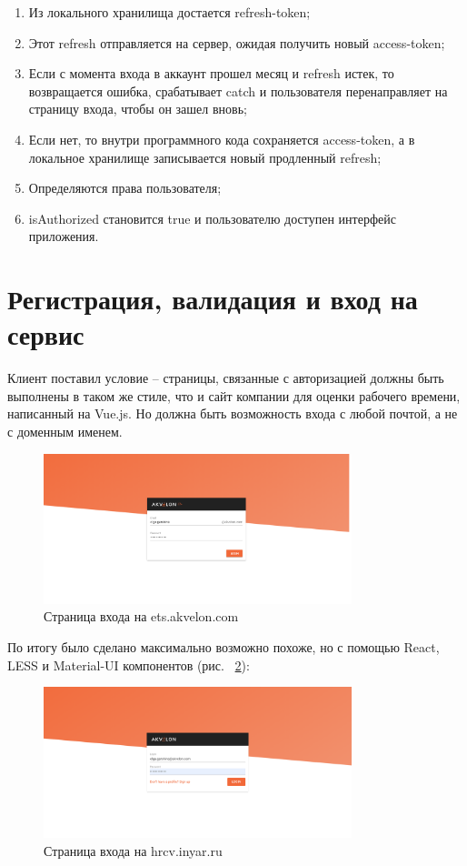 \documentclass[a4paper,12pt]{diplom}
\begin{document}
\begin{enumerate}
\item Из локального хранилища достается refresh-token;
\item Этот refresh отправляется на сервер, ожидая получить новый access-token;
\item Если с момента входа в аккаунт прошел месяц и refresh истек, то возвращается ошибка, срабатывает catch и пользователя перенаправляет на страницу входа, чтобы он зашел вновь;
\item Если нет, то внутри программного кода сохраняется access-token, а в локальное хранилище записывается новый продленный refresh;
\item Определяются права пользователя;
\item isAuthorized становится true и пользователю доступен интерфейс приложения.

\end{enumerate}

\section{Регистрация, валидация и вход на сервис}

Клиент поставил условие -- страницы, связанные с авторизацией должны быть выполнены в таком же стиле, что и сайт компании для
оценки рабочего времени, написанный на Vue.js. Но должна быть возможность входа с любой почтой, а не с доменным именем.

\begin{figure}[!ht]
\centering
\includegraphics[width=0.8\textwidth]{resources/ets.png}
\caption{Страница входа на ets.akvelon.com}
\label{fig:1}
\end{figure}

По итогу было сделано максимально возможно похоже, но с помощью React, LESS и Material-UI компонентов (рис. ~\ref{2}):

\begin{figure}[!ht]
\centering
\includegraphics[width=0.8\textwidth]{resources/signin.png}
\caption{Страница входа на hrcv.inyar.ru}
\label{2}
\end{figure}
\end{document}
